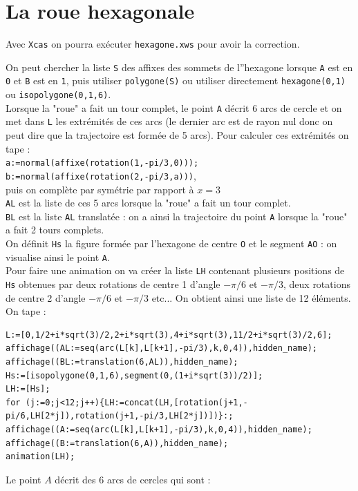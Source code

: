 \documentclass[a4paper,11pt]{book}
\begin{document}
\section{La roue hexagonale}
Avec {\tt Xcas} on pourra ex\'ecuter {\tt hexagone.xws} pour avoir la 
correction.

On peut chercher la liste {\tt S} des affixes des sommets de l''hexagone
lorsque  {\tt A} est en {\tt 0} et {\tt B} est en {\tt 1}, puis utiliser
{\tt polygone(S)} ou utiliser directement {\tt hexagone(0,1)} ou
{\tt isopolygone(0,1,6)}.\\
Lorsque la "roue" a fait un tour complet, le point {\tt A} d\'ecrit 6 arcs de 
cercle et on met dans {\tt L} les extr\'emit\'es de ces arcs (le dernier arc 
est de rayon nul donc on peut dire que la trajectoire est form\'ee de 5 arcs). 
Pour calculer ces extr\'emit\'es on tape :\\
{\tt a:=normal(affixe(rotation(1,-pi/3,0)));}\\
{\tt b:=normal(affixe(rotation(2,-pi/3,a)))},\\
puis on compl\`ete par sym\'etrie par rapport \`a $x=3$\\
{\tt AL} est la liste de ces 5 arcs lorsque la "roue" a fait un tour complet.\\
{\tt BL} est la liste {\tt AL} translat\'ee : on a ainsi la trajectoire du 
point {\tt A} lorsque la "roue" a fait 2 tours complets.\\
On d\'efinit {\tt Hs} la figure form\'ee par l'hexagone de centre {\tt O}
et le segment {\tt AO} : on visualise ainsi le point {\tt A}.\\
Pour faire une animation on va cr\'eer la liste {\tt LH} contenant plusieurs 
positions de  {\tt Hs} obtenues par deux rotations de centre 1 d'angle $-\pi/6$
et $-\pi/3$, deux rotations de centre 2 d'angle $-\pi/6$ et $-\pi/3$ etc...
On obtient ainsi une liste de 12 \'el\'ements.\\
On tape :
\begin{verbatim}
L:=[0,1/2+i*sqrt(3)/2,2+i*sqrt(3),4+i*sqrt(3),11/2+i*sqrt(3)/2,6];
affichage((AL:=seq(arc(L[k],L[k+1],-pi/3),k,0,4)),hidden_name);
affichage((BL:=translation(6,AL)),hidden_name);
Hs:=[isopolygone(0,1,6),segment(0,(1+i*sqrt(3))/2)];
LH:=[Hs];
for (j:=0;j<12;j++){LH:=concat(LH,[rotation(j+1,-pi/6,LH[2*j]),rotation(j+1,-pi/3,LH[2*j])])}:;
affichage((A:=seq(arc(L[k],L[k+1],-pi/3),k,0,4)),hidden_name);
affichage((B:=translation(6,A)),hidden_name);
animation(LH);
\end{verbatim}
Le point $A$ d\'ecrit des 6 arcs de cercles qui sont :
\end{document}
